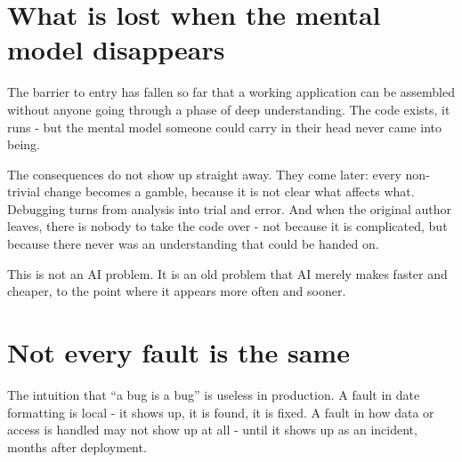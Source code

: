 \section{What is lost when the mental model disappears}

The barrier to entry has fallen so far that a working application can be assembled without anyone going through a phase of deep understanding.
The code exists, it runs - but the mental model someone could carry in their head never came into being.

The consequences do not show up straight away.
They come later: every non-trivial change becomes a gamble, because it is not clear what affects what.
Debugging turns from analysis into trial and error.
And when the original author leaves, there is nobody to take the code over - not because it is complicated, but because there never was an understanding that could be handed on.

This is not an AI problem.
It is an old problem that AI merely makes faster and cheaper, to the point where it appears more often and sooner.

\section{Not every fault is the same}

The intuition that \enquote{a bug is a bug} is useless in production.
A fault in date formatting is local - it shows up, it is found, it is fixed.
A fault in how data or access is handled may not show up at all - until it shows up as an incident, months after deployment.

